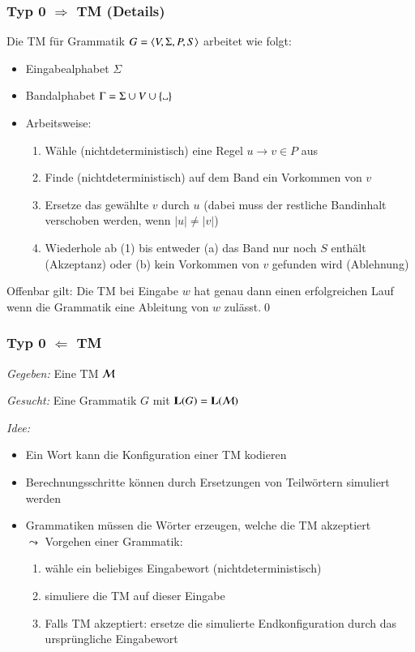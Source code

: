 \documentclass[aspectratio=1610,onlymath]{beamer}
\begin{document}
\begin{frame}\frametitle{Typ 0 $\Rightarrow$ TM (Details)}

Die TM für Grammatik $G=\langle{V,\Sigma,P,S}\rangle$ arbeitet wie folgt:
\begin{itemize}
\item Eingabealphabet $\Sigma$
\item Bandalphabet $\Gamma=\Sigma\cup V\cup\{\blank\}$
\item Arbeitsweise:
	\begin{enumerate}[(1)]
	\item Wähle (nichtdeterministisch) eine Regel $u\to v\in P$ aus
	\item Finde (nichtdeterministisch) auf dem Band ein Vorkommen von $v$
	\item Ersetze das gewählte $v$ durch $u$ (dabei muss der restliche Bandinhalt verschoben werden, wenn $|u|\neq|v|$)
	\item Wiederhole ab (1) bis entweder (a) das Band nur noch $S$ enthält (Akzeptanz) oder (b) kein Vorkommen von $v$ gefunden wird (Ablehnung)
	\end{enumerate}
\end{itemize}

Offenbar gilt: Die TM bei Eingabe $w$ hat genau dann einen erfolgreichen Lauf wenn die Grammatik eine Ableitung von $w$ zulässt.\qed


\end{frame}

\begin{frame}\frametitle{Typ 0 $\Leftarrow$ TM}

\emph{Gegeben:} Eine TM $\mathcal{M}$
\medskip

\emph{Gesucht:} Eine Grammatik $G$ mit $\textbf{\textcolor{black}{L}}(G)=\textbf{\textcolor{black}{L}}(\mathcal{M})$
\medskip\pause

\emph{Idee:}
\begin{itemize}
\item Ein Wort kann die Konfiguration einer TM kodieren
\item Berechnungsschritte können durch Ersetzungen von Teilwörtern simuliert werden\pause
\item Grammatiken müssen die Wörter erzeugen, welche die TM akzeptiert\\ $\leadsto$ Vorgehen einer Grammatik:
\begin{enumerate}[(1)]
\item wähle ein beliebiges Eingabewort (nichtdeterministisch)
\item simuliere die TM auf dieser Eingabe
\item Falls TM akzeptiert: ersetze die simulierte Endkonfiguration durch das ursprüngliche Eingabewort
\end{enumerate}
\end{itemize}

\end{frame}
\end{document}
